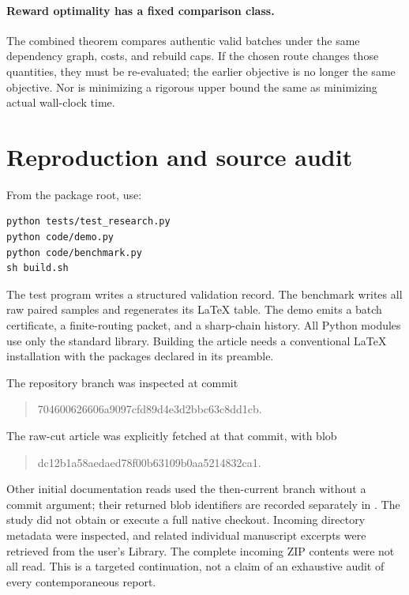 \documentclass[11pt]{article}
\theoremstyle{definition}
\newcommand{\code}[1]{\texttt{\detokenize{#1}}}
\begin{document}
\paragraph{Reward optimality has a fixed comparison class.}
The combined theorem compares authentic valid batches under the same dependency graph, costs, and rebuild caps. If the chosen route changes those quantities, they must be re-evaluated; the earlier objective is no longer the same objective. Nor is minimizing a rigorous upper bound the same as minimizing actual wall-clock time.

\section{Reproduction and source audit}\label{app:reproduction}
From the package root, use:
\begin{lstlisting}
python tests/test_research.py
python code/demo.py
python code/benchmark.py
sh build.sh
\end{lstlisting}
The test program writes a structured validation record. The benchmark writes all raw paired samples and regenerates its LaTeX table. The demo emits a batch certificate, a finite-routing packet, and a sharp-chain history. All Python modules use only the standard library. Building the article needs a conventional LaTeX installation with the packages declared in its preamble.

The repository branch was inspected at commit
\begin{quote}\small\ttfamily
704600626606a9097cfd89d4e3d2bbc63c8dd1cb.
\end{quote}
The raw-cut article was explicitly fetched at that commit, with blob
\begin{quote}\small\ttfamily
dc12b1a58aedaed78f00b63109b0aa5214832ca1.
\end{quote}
Other initial documentation reads used the then-current branch without a commit argument; their returned blob identifiers are recorded separately in \code{SOURCE_AUDIT.md}. The study did not obtain or execute a full native checkout. Incoming directory metadata were inspected, and related individual manuscript excerpts were retrieved from the user's Library. The complete incoming ZIP contents were not all read. This is a targeted continuation, not a claim of an exhaustive audit of every contemporaneous report.
\end{document}
